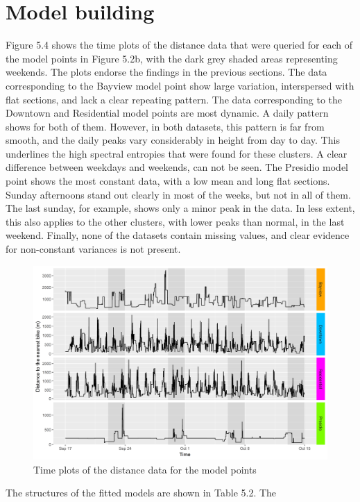 \documentclass[12pt,oneside]{reedthesis}
\begin{document}
\section{Model building}\label{model-building}

Figure 5.4 shows the time plots of the distance data that were queried
for each of the model points in Figure 5.2b, with the dark grey shaded
areas representing weekends. The plots endorse the findings in the
previous sections. The data corresponding to the Bayview model point
show large variation, interspersed with flat sections, and lack a clear
repeating pattern. The data corresponding to the Downtown and
Residential model points are most dynamic. A daily pattern shows for
both of them. However, in both datasets, this pattern is far from
smooth, and the daily peaks vary considerably in height from day to day.
This underlines the high spectral entropies that were found for these
clusters. A clear difference between weekdays and weekends, can not be
seen. The Presidio model point shows the most constant data, with a low
mean and long flat sections. Sunday afternoons stand out clearly in most
of the weeks, but not in all of them. The last sunday, for example,
shows only a minor peak in the data. In less extent, this also applies
to the other clusters, with lower peaks than normal, in the last
weekend. Finally, none of the datasets contain missing values, and clear
evidence for non-constant variances is not present.
\begin{figure}[H]
\includegraphics[width=\textwidth]{Figures/timeplots} \caption{Time plots of the distance data for the model points}\label{fig:timeplots}
\end{figure}
The structures of the fitted models are shown in Table 5.2. The
\end{document}
